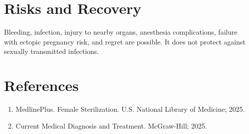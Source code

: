 \section*{Risks and Recovery}
Bleeding, infection, injury to nearby organs, anesthesia complications, failure with ectopic pregnancy risk, and regret are possible. It does not protect against sexually transmitted infections.
\section*{References}
\begin{enumerate}\item MedlinePlus. Female Sterilization. U.S. National Library of Medicine; 2025.\item Current Medical Diagnosis and Treatment. McGraw-Hill; 2025.\end{enumerate}
\clearpage

